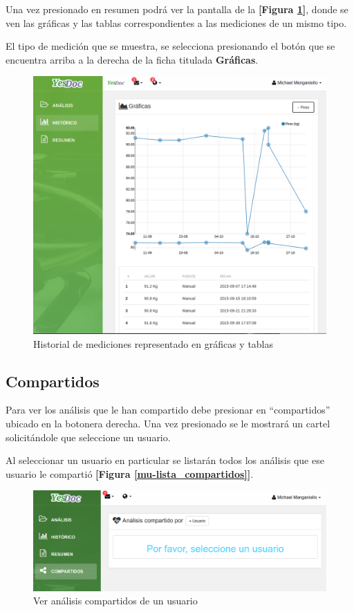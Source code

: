 Una vez presionado en resumen podrá ver la pantalla de la \textbf{[Figura \ref{mu-historico}]}, donde se ven las gráficas y las tablas correspondientes a las mediciones de un mismo tipo.

El tipo de medición que se muestra, se selecciona presionando el botón que se encuentra arriba a la derecha de la ficha titulada \textbf{Gráficas}.

\begin{figure}
	\centering
	\includegraphics[width=.8\textwidth]{img/manual_de_usuario/historico}
	\caption{Historial de mediciones representado en gráficas y tablas}
	\label{mu-historico}
\end{figure}

\subsection{Compartidos} \label{compartidos}
Para ver los análisis que le han compartido debe presionar en ``compartidos'' ubicado en la botonera derecha. Una vez presionado se le mostrará un cartel solicitándole que seleccione un usuario. 

Al seleccionar un usuario en particular se listarán todos los análisis que ese usuario le compartió \textbf{[Figura \ref{mu-lista_compartidos}]}.
\begin{figure}
	\centering
	\includegraphics[width=.8\textwidth]{img/manual_de_usuario/compartidos_seleccion_usuario}
	\caption{Ver análisis compartidos de un usuario}
	\label{mu-compartidos_seleccion_usuario}
\end{figure}


